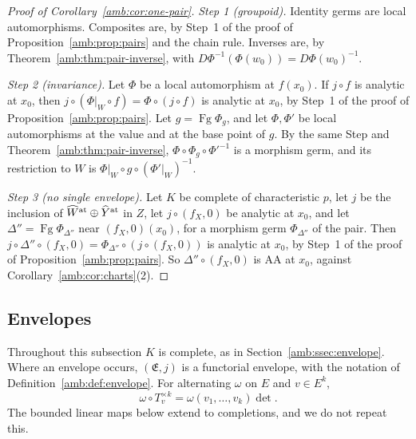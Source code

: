 \begin{proof}[Proof of Corollary~\ref{amb:cor:one-pair}]
\emph{Step 1 (groupoid).} Identity germs are local automorphisms. Composites are, by Step~1 of the proof of Proposition~\ref{amb:prop:pairs} and the chain rule. Inverses are, by Theorem~\ref{amb:thm:pair-inverse}, with $D\Phi^{-1}(\Phi(w_0))=D\Phi(w_0)^{-1}$.

\emph{Step 2 (invariance).} Let $\Phi$ be a local automorphism at $f(x_0)$. If $j\circ f$ is analytic at $x_0$, then $j\circ(\Phi|_W\circ f)=\Phi\circ(j\circ f)$ is analytic at $x_0$, by Step~1 of the proof of Proposition~\ref{amb:prop:pairs}. Let $g=\operatorname{Fg}\Phi_g$, and let $\Phi,\Phi'$ be local automorphisms at the value and at the base point of $g$. By the same Step and Theorem~\ref{amb:thm:pair-inverse}, $\Phi\circ\Phi_g\circ\Phi'^{-1}$ is a morphism germ, and its restriction to $W$ is $\Phi|_W\circ g\circ(\Phi'|_W)^{-1}$.

\emph{Step 3 (no single envelope).} Let $K$ be complete of characteristic $p$, let $j$ be the inclusion of $\widehat W^{\rm at}\oplus\widehat Y^{\rm at}$ in $Z$, let $j\circ(f_X,0)$ be analytic at $x_0$, and let $\Delta''=\operatorname{Fg}\Phi_{\Delta''}$ near $(f_X,0)(x_0)$, for a morphism germ $\Phi_{\Delta''}$ of the pair. Then $j\circ\Delta''\circ(f_X,0)=\Phi_{\Delta''}\circ(j\circ(f_X,0))$ is analytic at $x_0$, by Step~1 of the proof of Proposition~\ref{amb:prop:pairs}. So $\Delta''\circ(f_X,0)$ is AA at $x_0$, against Corollary~\ref{amb:cor:charts}(2).
\end{proof}

\subsection{Envelopes}\label{amb:ssec:proofs-envelope}

Throughout this subsection $K$ is complete, as in Section~\ref{amb:ssec:envelope}. Where an envelope occurs, $(\mathfrak E,j)$ is a functorial envelope, with the notation of Definition~\ref{amb:def:envelope}. For alternating $\omega$ on $E$ and $v\in E^k$,
\begin{equation}\label{amb:c:det}
 \omega\circ T_v^{\times k}=\omega(v_1,\dots,v_k)\det .
\end{equation}
The bounded linear maps below extend to completions, and we do not repeat this.

